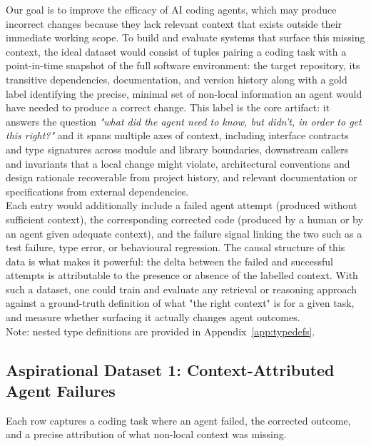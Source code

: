 \documentclass[a4paper,12pt]{article}
\begin{document}
Our goal is to improve the efficacy of AI coding agents, which may produce incorrect changes because they lack relevant context that exists outside their immediate working scope. To build and evaluate systems that surface this missing context, the ideal dataset would consist of tuples pairing a coding task with a point-in-time snapshot of the full software environment: the target repository, its transitive dependencies, documentation, and version history along with a gold label identifying the precise, minimal set of non-local information an agent would have needed to produce a correct change. This label is the core artifact: it answers the question \textit{"what did the agent need to know, but didn't, in order to get this right?"} and it spans multiple axes of context, including interface contracts and type signatures across module and library boundaries, downstream callers and invariants that a local change might violate, architectural conventions and design rationale recoverable from project history, and relevant documentation or specifications from external dependencies.\\

\noindent Each entry would additionally include a failed agent attempt (produced without sufficient context), the corresponding corrected code (produced by a human or by an agent given adequate context), and the failure signal linking the two such as a test failure, type error, or behavioural regression. The causal structure of this data is what makes it powerful: the delta between the failed and successful attempts is attributable to the presence or absence of the labelled context. With such a dataset, one could train and evaluate any retrieval or reasoning approach against a ground-truth definition of what "the right context" is for a given task, and measure whether surfacing it actually changes agent outcomes.\\

\noindent Note: nested type definitions are provided in Appendix~\ref{app:typedefs}.

\subsection*{Aspirational Dataset 1: Context-Attributed Agent Failures}

\noindent Each row captures a coding task where an agent failed, the corrected outcome, and a precise attribution of what non-local context was missing. 
\end{document}
